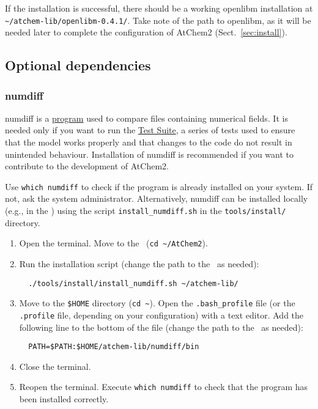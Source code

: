 If the installation is successful, there should be a working openlibm
installation at \texttt{\textasciitilde/atchem-lib/openlibm-0.4.1/}.
Take note of the path to openlibm, as it will be needed later to
complete the configuration of AtChem2 (Sect.~\ref{sec:install}).

\subsection{Optional dependencies} \label{subsec:optional-dependencies}

\subsubsection{numdiff}

numdiff is a \href{https://www.nongnu.org/numdiff/}{program} used to
compare files containing numerical fields. It is needed only if you
want to run the \hyperref[sec:test-suite]{Test Suite}, a series of
tests used to ensure that the model works properly and that changes to
the code do not result in unintended behaviour. Installation of
numdiff is recommended if you want to contribute to the development of
AtChem2.

Use \verb|which numdiff| to check if the program is already installed
on your system. If not, ask the system administrator. Alternatively,
numdiff can be installed locally (e.g., in the \depdir) using the
script \texttt{install\_numdiff.sh} in the \texttt{tools/install/}
directory.

\begin{enumerate}
\item Open the terminal. Move to the \maindir\ (\verb|cd ~/AtChem2|).
\item Run the installation script (change the path to the \depdir\ as
  needed):
  \begin{verbatim}
  ./tools/install/install_numdiff.sh ~/atchem-lib/
  \end{verbatim}
\item Move to the \texttt{\$HOME} directory (\texttt{cd\ \textasciitilde}).
  Open the \texttt{.bash\_profile} file (or the \texttt{.profile}
  file, depending on your configuration) with a text editor. Add the
  following line to the bottom of the file (change the path to the
  \depdir\ as needed):
  \begin{verbatim}
  PATH=$PATH:$HOME/atchem-lib/numdiff/bin
  \end{verbatim}
\item Close the terminal.
\item Reopen the terminal. Execute \verb|which numdiff| to check that
  the program has been installed correctly.
\end{enumerate}

